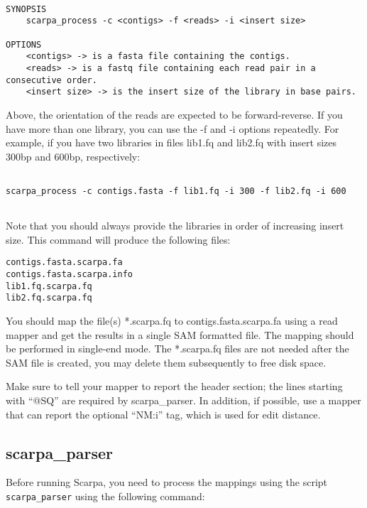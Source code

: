 \documentclass[12pt,a4paper]{report}
\begin{document}
\begin{lstlisting}

SYNOPSIS
    scarpa_process -c <contigs> -f <reads> -i <insert size>

OPTIONS
    <contigs> -> is a fasta file containing the contigs.
    <reads> -> is a fastq file containing each read pair in a consecutive order.
    <insert size> -> is the insert size of the library in base pairs.

\end{lstlisting}

Above, the orientation of the reads are expected to be forward-reverse. If you have more than one library, you can use the -f and -i options repeatedly. For example, if you have two libraries in files lib1.fq and lib2.fq with insert sizes 300bp and 600bp, respectively:

\begin{lstlisting}

scarpa_process -c contigs.fasta -f lib1.fq -i 300 -f lib2.fq -i 600


\end{lstlisting}

Note that you should always provide the libraries in order of increasing insert size. This command will produce the following files:

\begin{lstlisting}
contigs.fasta.scarpa.fa
contigs.fasta.scarpa.info
lib1.fq.scarpa.fq
lib2.fq.scarpa.fq
\end{lstlisting}

You should map the file(s) *.scarpa.fq to contigs.fasta.scarpa.fa using a read mapper and get the results in a single SAM formatted file. The mapping should be performed in single-end mode. The *.scarpa.fq files are not needed after the SAM file is created, you may delete them subsequently to free disk space.

Make sure to tell your mapper to report the header section; the lines starting with ``@SQ'' are required by scarpa\_parser. In addition, if possible, use a mapper that can report the optional ``NM:i'' tag, which is used for edit distance.

\subsection{scarpa\_parser}

Before running Scarpa, you need to process the mappings using the script \texttt{scarpa\_parser} using the following command:
\end{document}

